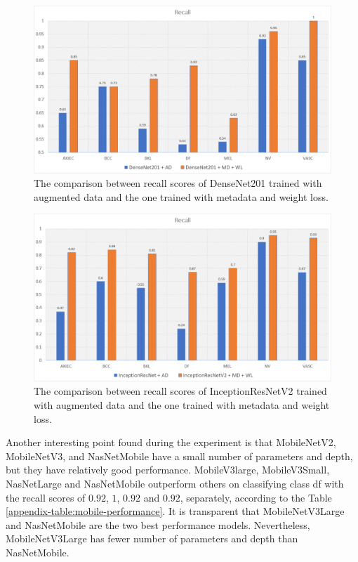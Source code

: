 \documentclass[sensors,article,accept,pdftex,moreauthors]{Definitions/mdpi}
\begin{document}
	\begin{figure}[H]
		\centering
		\includegraphics[width=1\linewidth]{Definitions/den re}
		\caption{The comparison between recall scores of DenseNet201 trained with augmented data and the one trained with metadata and weight loss.}
		\label{fig:den recall}
	\end{figure}\unskip
	
	\begin{figure}[H]
		\centering
		\includegraphics[width=1\linewidth]{Definitions/in re}
		\caption{The comparison between recall scores of InceptionResNetV2 trained with augmented data and the one trained with metadata and weight loss.}
		\label{fig:incep recall}
	\end{figure}
	
	Another interesting point found during the experiment is that MobileNetV2, MobileNetV3, and NasNetMobile have a small number of parameters and depth, but they have relatively good performance. MobileV3large, MobileV3Small, NasNetLarge and NasNetMobile outperform others on classifying class df with the recall scores of $0.92$, $1$, $0.92$ and  $0.92$, separately, according to the Table \ref{appendix-table:mobile-performance}. It is transparent that MobileNetV3Large and NasNetMobile are the two best performance models. Nevertheless, MobileNetV3Large has fewer number of parameters and depth than NasNetMobile.
\end{document}
